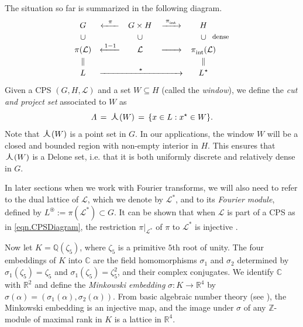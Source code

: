 \documentclass[reqno]{amsart}
\newcommand{\R}{\mathbb{R}}
\newcommand{\C}{\mathbb{C}}
\newcommand{\Z}{\mathbb{Z}}
\newcommand{\Q}{\mathbb{Q}}
\newcommand{\rar}{\rightarrow}
\newcommand{\mc}{\mathcal}
\newcommand{\vL}{\varLambda}
\newcommand{\cL}{\mathcal{L}}
\newcommand{\oplam}{\mbox{\Large $\curlywedge$}}
\begin{document}
The situation so far is summarized in the following diagram.
\begin{equation}\label{eqn.CPSDiagram}
	\renewcommand{\arraystretch}{1.2}\begin{array}{r@{}ccccc@{}l}
		& G & \xleftarrow{\,\;\;\pi\;\;\,} & G \times H & 
		\xrightarrow{\;\pi^{}_{\mathrm{int}\;}} & H & \\
		& \cup & & \cup & & \cup & \hspace*{-1ex} 
		\raisebox{1pt}{\text{\footnotesize dense}} \\
		& \pi(\cL) & \xleftarrow{\; 1-1 \;} & \cL & 
		\xrightarrow{\; \hphantom{1-1} \;} & \pi^{}_{\mathrm{int}}(\cL) & \\
		& \| & & & & \| & \\
		& L & \multicolumn{3}{c}{\xrightarrow{\qquad\qquad\;\;\,\star\,
				\;\;\qquad\qquad}} 
		&  {L_{}}^{\star} & \\
	\end{array}\renewcommand{\arraystretch}{1}
\end{equation}
Given a CPS $(G,H,\cL)$ and a set $W\subseteq H$ (called the
\emph{window}), we define the \emph{cut and project set} associated to $W$ as
\begin{equation*}
	\vL \, = \, \oplam(W)\, = \, 
	\{x\in L : x^{\star}\in W \}  .
\end{equation*}
Note that $\oplam(W)$ is a point set in $G$. In our applications, the window $W$ will be a closed and bounded region with non-empty interior in $H$. This ensures that $\oplam(W)$ is a Delone set, i.e. that it is both uniformly discrete and relatively dense in $G$.

In later sections when we work with Fourier transforms, we will also need to refer to the dual lattice of $\cL$, which we denote by $\cL^{*}$, and to its \textit{Fourier module}, defined by $L^{\circledast}:=\pi(\cL^{*})\subset G$. It can be shown that when $\mc{L}$ is part of a CPS as in \eqref{eqn.CPSDiagram}, the restriction $\pi|_{\cL^*}$ of $\pi$ to $\cL^*$ is injective \cite[Proposition 2.2]{BaakHayn2026}.


Now let $K=\Q(\zeta_5)$, where $\zeta_5$ is a primitive $5$th root of unity. The four embeddings of $K$ into $\C$ are the field homomorphisms $\sigma_1$ and $\sigma_2$ determined by $\sigma_1(\zeta_5)=\zeta_5$ and $\sigma_1(\zeta_5)=\zeta_5^2$, and their complex conjugates. We identify $\C$ with $\R^2$ and define the \textit{Minkowski embedding} $\sigma:K\rar\R^4$ by $\sigma(\alpha)=(\sigma_1(\alpha),\sigma_2(\alpha))$. From basic algebraic number theory (see \cite[Chapter 1]{Swinn2001}), the Minkowski embedding is an injective map, and the image under $\sigma$ of any $\Z$-module of maximal rank in $K$ is a lattice in $\R^4$.
\end{document}

